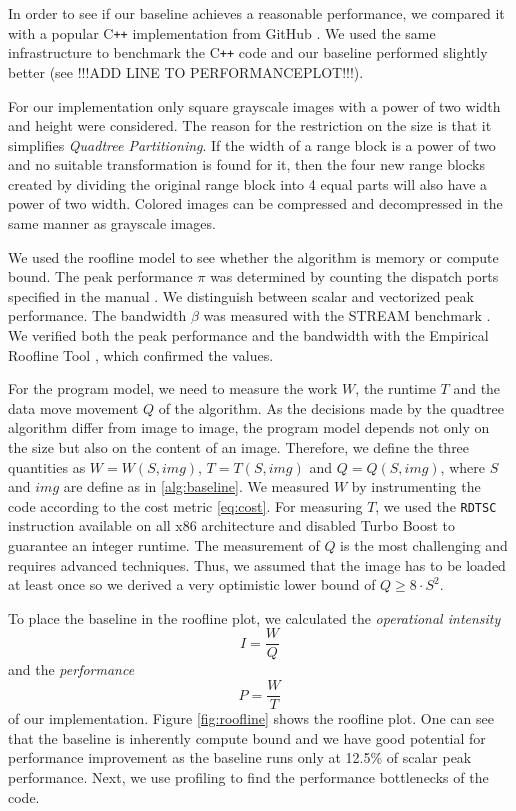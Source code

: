 In order to see if our baseline achieves a reasonable performance, we compared it with
a popular C\texttt{++} implementation from GitHub \cite{github-cpp}. We used the same infrastructure to benchmark
the C\texttt{++} code and our baseline performed slightly better (see !!!ADD LINE TO PERFORMANCEPLOT!!!).

 For our implementation only square grayscale images with a power
of two width and height were considered. The reason for the restriction on the
size is that it simplifies \textit{Quadtree Partitioning}. If the width of a
range block is a power of two and no suitable transformation is found for it,
then the four new range blocks created by dividing the original range block into
4 equal parts will also have a power of two width. Colored images can be
compressed and decompressed in the same manner as grayscale images.


 We used the roofline model \cite{applying-roofline} to see whether the algorithm is memory or
compute bound. The peak performance $\pi$ was determined by counting the dispatch
ports specified in the manual \cite{intel-opt-manual}. We distinguish between scalar and vectorized peak
performance. The bandwidth $\beta$ was measured with the STREAM benchmark \cite{stream}. We verified both the peak
performance and the bandwidth with the Empirical Roofline Tool \cite{ert}, which confirmed the values.

For the program model, we need to measure the work $W$, the runtime $T$ and the data move movement $Q$ of
the algorithm. As the decisions made by the quadtree algorithm differ from image to image, the program
model depends not only on the size but also on the content of an image. Therefore, we define the three 
quantities as $W=W(S, img)$, $T=T(S, img)$ and $Q=Q(S, img)$, where $S$ and $img$ are define as in 
\ref{alg:baseline}. We measured $W$ by instrumenting the code according to the cost metric \ref{eq:cost}.
For measuring $T$, we used the \texttt{RDTSC} instruction available on all x86 architecture and disabled
Turbo Boost to guarantee an integer runtime. The measurement of $Q$ is the most challenging and requires
advanced techniques. Thus, we assumed that the image has to be loaded at least once so we derived a very
optimistic lower bound of $Q \geq 8 \cdot S^2$.

To place the baseline in the roofline plot, we calculated the \textit{operational intensity}
$$
I=\frac{W}{Q}
$$
and the \textit{performance}
$$P=\frac{W}{T}$$
of our implementation. Figure \ref{fig:roofline} shows the 
roofline plot. One can see that the baseline is inherently compute bound and we have good potential for
performance improvement as the baseline runs only at 12.5\% of scalar peak performance. Next, we use 
profiling to find the performance bottlenecks of the code.

